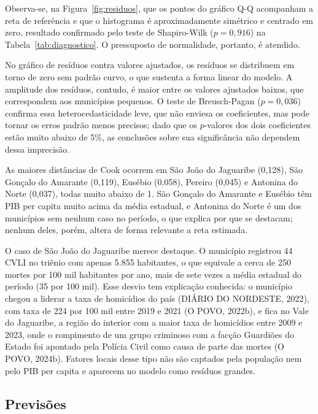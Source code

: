 \documentclass[12pt,a4paper]{article}
\begin{document}
	Observa-se, na Figura~\ref{fig:residuos}, que os pontos do gráfico Q-Q acompanham a reta de referência e que o histograma é aproximadamente simétrico e centrado em zero, resultado confirmado pelo teste de Shapiro-Wilk ($p = 0{,}916$) na Tabela~\ref{tab:diagnostico}. O pressuposto de normalidade, portanto, é atendido.
	
	No gráfico de resíduos contra valores ajustados, os resíduos se distribuem em torno de zero sem padrão curvo, o que sustenta a forma linear do modelo. A amplitude dos resíduos, contudo, é maior entre os valores ajustados baixos, que correspondem aos municípios pequenos. O teste de Breusch-Pagan ($p = 0{,}036$) confirma essa heterocedasticidade leve, que não enviesa os coeficientes, mas pode tornar os erros padrão menos precisos; dado que os $p$-valores dos dois coeficientes estão muito abaixo de 5\%, as conclusões sobre sua significância não dependem dessa imprecisão.
	
	As maiores distâncias de Cook ocorrem em São João do Jaguaribe (0,128), São Gonçalo do Amarante (0,119), Eusébio (0,058), Pereiro (0,045) e Antonina do Norte (0,037), todas muito abaixo de 1. São Gonçalo do Amarante e Eusébio têm PIB per capita muito acima da média estadual, e Antonina do Norte é um dos municípios sem nenhum caso no período, o que explica por que se destacam; nenhum deles, porém, altera de forma relevante a reta estimada.
	
	O caso de São João do Jaguaribe merece destaque. O município registrou 44 CVLI no triênio com apenas 5.855 habitantes, o que equivale a cerca de 250 mortes por 100 mil habitantes por ano, mais de sete vezes a média estadual do período (35 por 100 mil). Esse desvio tem explicação conhecida: o município chegou a liderar a taxa de homicídios do país (DIÁRIO DO NORDESTE, 2022), com taxa de 224 por 100 mil entre 2019 e 2021 (O POVO, 2022b), e fica no Vale do Jaguaribe, a região do interior com a maior taxa de homicídios entre 2009 e 2023, onde o rompimento de um grupo criminoso com a facção Guardiões do Estado foi apontado pela Polícia Civil como causa de parte das mortes (O POVO, 2024b). Fatores locais desse tipo não são captados pela população nem pelo PIB per capita e aparecem no modelo como resíduos grandes.
	
	\subsection{Previsões}
	
\end{document}
